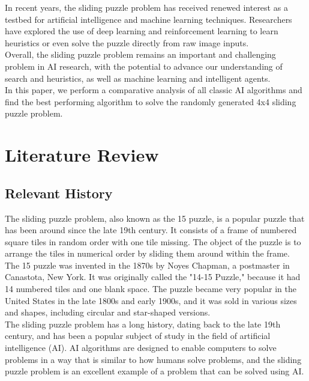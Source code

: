 \documentclass[12pt]{article}
\begin{document}
In recent years, the sliding puzzle problem has received renewed interest as a testbed for artificial intelligence and machine learning techniques. Researchers have explored the use of deep learning and reinforcement learning to learn heuristics or even solve the puzzle directly from raw image inputs. \\

Overall, the sliding puzzle problem remains an important and challenging problem in AI research, with the potential to advance our understanding of search and heuristics, as well as machine learning and intelligent agents. \\

In this paper, we perform a comparative analysis of all classic AI algorithms and find the best performing algorithm to solve the randomly generated 4x4 sliding puzzle problem.

\section{Literature Review}
\subsection{Relevant History}
The sliding puzzle problem, also known as the 15 puzzle, is a popular puzzle that has been around since the late 19th century. It consists of a frame of numbered square tiles in random order with one tile missing. The object of the puzzle is to arrange the tiles in numerical order by sliding them around within the frame. \\

The 15 puzzle was invented in the 1870s by Noyes Chapman, a postmaster in Canastota, New York. It was originally called the "14-15 Puzzle," because it had 14 numbered tiles and one blank space. The puzzle became very popular in the United States in the late 1800s and early 1900s, and it was sold in various sizes and shapes, including circular and star-shaped versions. \\

The sliding puzzle problem has a long history, dating back to the late 19th century, and has been a popular subject of study in the field of artificial intelligence (AI). AI algorithms are designed to enable computers to solve problems in a way that is similar to how humans solve problems, and the sliding puzzle problem is an excellent example of a problem that can be solved using AI. \\
\end{document}

